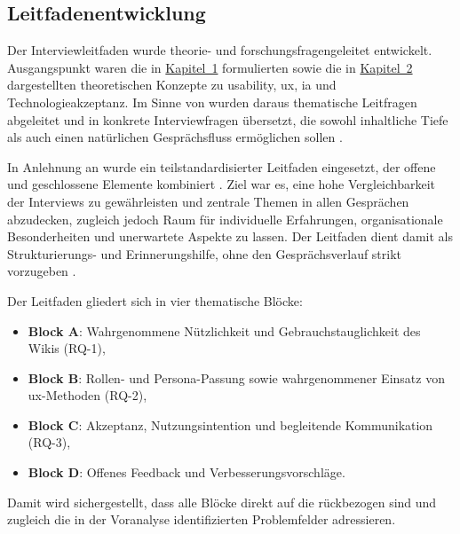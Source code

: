 \subsection{Leitfadenentwicklung}
\label{subsec:04-02-02_interview-guide-development}

Der Interviewleitfaden wurde theorie- und forschungsfragengeleitet entwickelt. Ausgangspunkt waren die in \hyperref[ch:01_purpose-and-objectives]{Kapitel~1} formulierten  sowie die in \hyperref[ch:02_theoretical-foundations]{Kapitel~2} dargestellten theoretischen Konzepte zu \Gls{usability}, \acrlong{ux}, \Gls{ia} und Technologieakzeptanz. Im Sinne von \citeauthor{405:KvaleBrinkmann2015} wurden daraus thematische Leitfragen abgeleitet und in konkrete Interviewfragen übersetzt, die sowohl inhaltliche Tiefe als auch einen natürlichen Gesprächsfluss ermöglichen sollen \cite{405:KvaleBrinkmann2015}.

In Anlehnung an \citeauthor{420:GlaeserLaudel2010} wurde ein teilstandardisierter Leitfaden eingesetzt, der offene und geschlossene Elemente kombiniert \cite{420:GlaeserLaudel2010}. Ziel war es, eine hohe Vergleichbarkeit der Interviews zu gewährleisten und zentrale Themen in allen Gesprächen abzudecken, zugleich jedoch Raum für individuelle Erfahrungen, organisationale Besonderheiten und unerwartete Aspekte zu lassen. Der Leitfaden dient damit als Strukturierungs- und Erinnerungshilfe, ohne den Gesprächsverlauf strikt vorzugeben \cite{420:GlaeserLaudel2010,422:Flick2018}.

Der Leitfaden gliedert sich in vier thematische Blöcke:
\begin{itemize}
  \item \textbf{Block A}: Wahrgenommene Nützlichkeit und Gebrauchstauglichkeit des Wikis (RQ-1),
  \item \textbf{Block B}: Rollen- und Persona-Passung sowie wahrgenommener Einsatz von \Gls{ux}-Methoden (RQ-2),
  \item \textbf{Block C}: Akzeptanz, Nutzungsintention und begleitende Kommunikation (RQ-3),
  \item \textbf{Block D}: Offenes Feedback und Verbesserungsvorschläge.
\end{itemize}
Damit wird sichergestellt, dass alle Blöcke direkt auf die  rückbezogen sind und zugleich die in der Voranalyse identifizierten Problemfelder adressieren.

